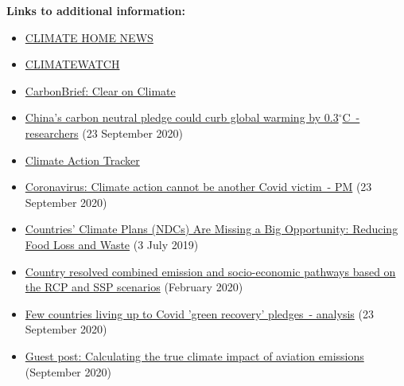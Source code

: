 \documentclass[12pt]{article}
\begin{document}
 \noindent \textbf{Links to additional information:}
 \begin{itemize}
 \item \href{https://www.climatechangenews.com/}{CLIMATE HOME NEWS} 
 \vspace{-.2cm} \item \href{https://www.climatewatchdata.org/}{CLIMATEWATCH} 
 \vspace{-.2cm} \item \href{https://www.carbonbrief.org/}{CarbonBrief: Clear on Climate} 
 \vspace{-.2cm} \item \href{https://uk.reuters.com/article/us-climate-change-china/chinas-carbon-neutral-pledge-could-curb-global-warming-by-0-3c-researchers-idUKKCN26E325?utm_campaign=Carbon%20Brief%20Daily%20Briefing&utm_medium=email&utm_source=Revue%20newsletter}{China's carbon neutral pledge could curb global warming by 0.3$^{\circ}$C~- researchers} (23 September 2020)
 \vspace{-.2cm} \item \href{https://climateactiontracker.org/}{Climate Action Tracker} 
 \vspace{-.2cm} \item \href{https://www.bbc.com/news/science-environment-54274644?utm_campaign=Carbon%20Brief%20Daily%20Briefing&utm_medium=email&utm_source=Revue%20newsletter}{Coronavirus: Climate action cannot be another Covid victim~- PM} (23 September 2020)
 \vspace{-.2cm} \item \href{https://www.wri.org/blog/2019/07/countries-climate-plans-ndcs-are-missing-big-opportunity-reducing-food-loss-and-waste}{Countries' Climate Plans (NDCs) Are Missing a Big Opportunity: Reducing Food Loss and Waste} (3 July 2019)
 \vspace{-.2cm} \item \href{https://zenodo.org/record/3638137#.X2sqPIuxU2w}{Country resolved combined emission and socio-economic pathways based on the RCP and SSP scenarios} (February 2020)
 \vspace{-.2cm} \item \href{https://www.theguardian.com/environment/2020/sep/23/few-countries-living-up-to-green-recovery-promises-analysis?utm_campaign=Carbon%20Brief%20Daily%20Briefing&utm_medium=email&utm_source=Revue%20newsletter}{Few countries living up to Covid 'green recovery' pledges~- analysis} (23 September 2020)
 \vspace{-.2cm} \item \href{https://www.carbonbrief.org/guest-post-calculating-the-true-climate-impact-of-aviation-emissions?utm_campaign=Carbon%20Brief%20Daily%20Briefing&utm_medium=email&utm_source=Revue%20newsletter}{Guest post: Calculating the true climate impact of aviation emissions} (September 2020)

\end{itemize}
\end{document}
